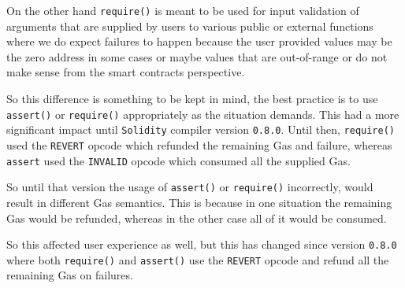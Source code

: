 On the other hand \texttt{require()} is meant to be used for input
validation of arguments that are supplied by users to various public or
external functions where we do expect failures to happen because the
user provided values may be the zero address in some cases or maybe
values that are out-of-range or do not make sense from the smart
contracts perspective.

So this difference is something to be kept in mind, the best practice is
to use \texttt{assert()} or \texttt{require()} appropriately as the
situation demands. This had a more significant impact until
\texttt{Solidity} compiler version \texttt{0.8.0}. Until then,
\texttt{require()} used the \texttt{REVERT} opcode which refunded the
remaining Gas and failure, whereas \texttt{assert} used the
\texttt{INVALID} opcode which consumed all the supplied Gas.

So until that version the usage of \texttt{assert()} or
\texttt{require()} incorrectly, would result in different Gas semantics.
This is because in one situation the remaining Gas would be refunded,
whereas in the other case all of it would be consumed.

So this affected user experience as well, but this has changed since
version \texttt{0.8.0} where both \texttt{require()} and
\texttt{assert()} use the \texttt{REVERT} opcode and refund all the
remaining Gas on failures.
